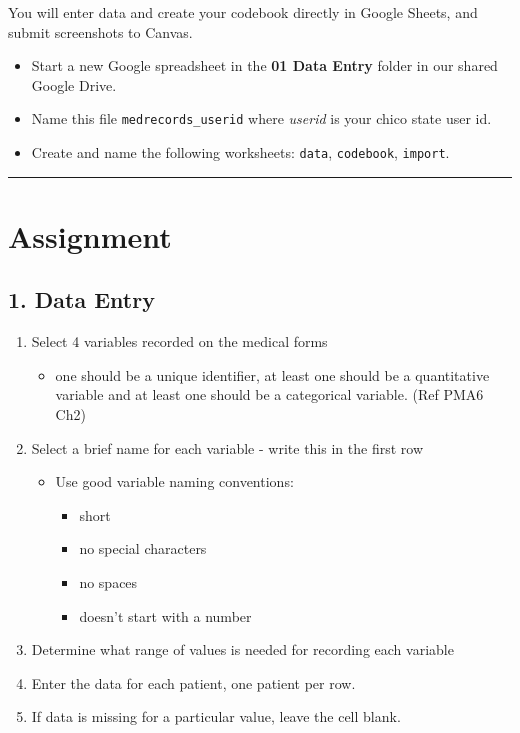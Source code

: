\documentclass[
  letterpaper,
  DIV=11,
  numbers=noendperiod]{scrartcl}
\providecommand{\tightlist}{%
  \setlength{\itemsep}{0pt}\setlength{\parskip}{0pt}}\usepackage{longtable,booktabs,array}
\begin{document}
You will enter data and create your codebook directly in Google Sheets,
and submit screenshots to Canvas.

\begin{itemize}
\tightlist
\item
  Start a new Google spreadsheet in the \textbf{01 Data Entry} folder in
  our shared Google Drive.
\item
  Name this file \texttt{medrecords\_userid} where \emph{userid} is your
  chico state user id.
\item
  Create and name the following worksheets: \texttt{data},
  \texttt{codebook}, \texttt{import}.
\end{itemize}

\begin{center}\rule{0.5\linewidth}{0.5pt}\end{center}

\hypertarget{assignment}{%
\section{Assignment}\label{assignment}}

\hypertarget{data-entry}{%
\subsection{1. Data Entry}\label{data-entry}}

\begin{enumerate}
\def\labelenumi{\arabic{enumi}.}
\tightlist
\item
  Select 4 variables recorded on the medical forms

  \begin{itemize}
  \tightlist
  \item
    one should be a unique identifier, at least one should be a
    quantitative variable and at least one should be a categorical
    variable. (Ref PMA6 Ch2)
  \end{itemize}
\item
  Select a brief name for each variable - write this in the first row

  \begin{itemize}
  \tightlist
  \item
    Use good variable naming conventions:

    \begin{itemize}
    \tightlist
    \item
      short
    \item
      no special characters
    \item
      no spaces
    \item
      doesn't start with a number
    \end{itemize}
  \end{itemize}
\item
  Determine what range of values is needed for recording each variable
\item
  Enter the data for each patient, one patient per row.
\item
  If data is missing for a particular value, leave the cell blank.
\end{enumerate}
\end{document}
